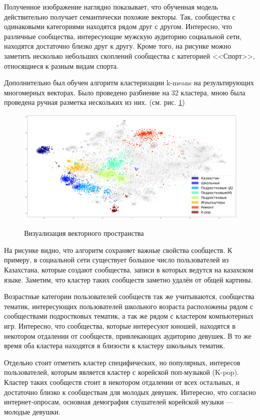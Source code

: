 \documentclass[times,specification,annotation]{itmo-student-thesis}
\begin{document}
Полученное изображение наглядно показывает, что обученная модель действительно получает семантически похожие векторы. Так, сообщества с одинаковыми категориями находятся рядом друг с другом. Интересно, что различные сообщества, интересующие мужскую аудиторию социальной сети, находятся достаточно близко друг к другу. Кроме того, на рисунке можно заметить несколько небольших скоплений сообщества с категорией <<Спорт>>, относящиеся к разным видам спорта.  

Дополнительно был обучен алгоритм кластеризации k-means на результирующих многомерных векторах. Было проведено разбиение на 32 кластера, мною была проведена ручная разметка нескольких из них. (см. рис. \ref{pic:clusters})

\begin{figure}[h]
\caption{Визуализация векторного пространства}
\centering
\includegraphics[width=1\textwidth]{clusters}
\label{pic:clusters}
\end{figure}

На рисунке видно, что алгоритм сохраняет важные свойства сообществ. К примеру, в социальной сети существует большое число пользователей из Казахстана, которые создают сообщества, записи в которых ведутся на казахском языке. Заметим, что кластер таких сообществ заметно удалён от общей картины. 

Возрастные категории пользователей сообществ так же учитываются, сообщества тематик, интересующих пользователей школьного возраста расположены рядом с сообществами подростковых тематик, а так же рядом с кластером компьютерных игр. Интересно, что сообщества, которые интересуют юношей, находятся в некотором отдалении от сообществ, привлекающих аудиторию девушек. В то же время оба кластера находятся в близости к кластеру школьных тематик.

Отдельно стоит отметить кластер специфических, но популярных, интересов пользователей, которым является кластер с корейской поп-музыкой (K-pop). Кластер таких сообществ стоит в некотором отдалении от всех остальных, и достаточно близко к сообществам для молодых девушек. Интересно, что согласно интернет-опросам, основная демография слушателей корейской музыки --- молодые девушки.
\end{document}
